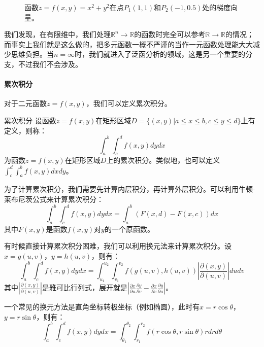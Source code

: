 \begin{figure}
    \centering
    
    \caption{函数$z = f(x, y) = x^2 + y^2$在点$P_1(1, 1)$和$P_2(-1, 0.5)$处的梯度向量。}
    \label{fig:gradient_example}
\end{figure}

我们发现，在有限维中，我们处理$\mathbb{R}^n \to \mathbb{R}$的函数时完全可以参考$\mathbb{R} \to \mathbb{R}$的情况；而事实上我们就是这么做的，把多元函数一概不严谨的当作一元函数处理能大大减少思维负担。当$n=\infty$时，我们就进入了泛函分析的领域，这是另一个重要的分支，不过我们不会涉及。

\paragraph{累次积分} 对于二元函数$z = f(x, y)$，我们可以定义累次积分。

\begin{definition}{累次积分}{}
设函数$z = f(x, y)$在矩形区域$D = \{(x, y) | a \le x \le b, c \le y \le d\}$上有定义，则称：
\begin{equation}
    \int_a^b \int_c^d f(x, y) dy dx
\end{equation}
为函数$z = f(x, y)$在矩形区域$D$上的累次积分。类似地，也可以定义$\int_c^d \int_a^b f(x, y) dx dy$。
\end{definition}

为了计算累次积分，我们需要先计算内层积分，再计算外层积分。可以利用牛顿-莱布尼茨公式来计算累次积分：
\begin{equation}
    \int_a^b \int_c^d f(x, y) dy dx = \int_a^b (F(x, d) - F(x, c)) dx
\end{equation}
其中$F(x, y)$是函数$f(x, y)$对$y$的一个原函数。

有时候直接计算累次积分困难，我们可以利用换元法来计算累次积分。设$x = g(u, v)$，$y = h(u, v)$，则有：
\begin{equation}
    \int_a^b \int_c^d f(x, y) dy dx = \int_{u_1}^{u_2} \int_{v_1}^{v_2} f(g(u, v), h(u, v)) \left| \frac{\partial(x, y)}{\partial(u, v)} \right| du dv
\end{equation}
其中$\left| \frac{\partial(x, y)}{\partial(u, v)} \right|$是雅可比行列式，展开就是$\left| \frac{\partial x}{\partial u} \frac{\partial y}{\partial v} - \frac{\partial x}{\partial v} \frac{\partial y}{\partial u} \right|$。

一个常见的换元方法是直角坐标转极坐标（例如椭圆），此时有$x = r \cos \theta$，$y = r \sin \theta$，则有：
\begin{equation}
    \int_a^b \int_c^d f(x, y) dy dx = \int_{\theta_1}^{\theta_2} \int_{r_1}^{r_2} f(r \cos \theta, r \sin \theta) r dr d\theta
\end{equation}

